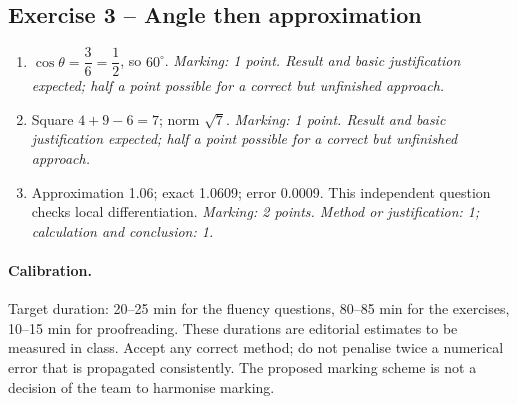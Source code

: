 \subsection*{Exercise 3 -- Angle then approximation}
\begin{enumerate}
\item $\cos \theta =\dfrac{3}{6}=\dfrac{1}{2}$, so $60^\circ$. \textit{Marking: 1 point. Result and basic justification expected; half a point possible for a correct but unfinished approach.}
\item Square $4+9-6=7$; norm $\sqrt7$. \textit{Marking: 1 point. Result and basic justification expected; half a point possible for a correct but unfinished approach.}
\item Approximation 1.06; exact 1.0609; error 0.0009. This independent question checks local differentiation. \textit{Marking: 2 points. Method or justification: 1; calculation and conclusion: 1.}
\end{enumerate}
\paragraph{Calibration.} Target duration: 20--25 min for the fluency questions, 80--85 min for the exercises, 10--15 min for proofreading. These durations are editorial estimates to be measured in class. Accept any correct method; do not penalise twice a numerical error that is propagated consistently. The proposed marking scheme is not a decision of the team to harmonise marking.
